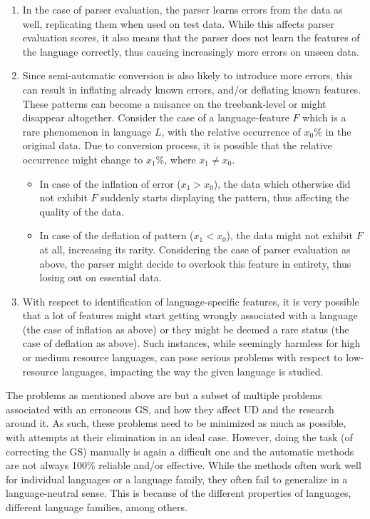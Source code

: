 \begin{enumerate}
    \item In the case of parser evaluation, the parser learns errors from the data as well, replicating them when used on test data. While this affects parser evaluation scores, it also means that the parser does not learn the features of the language correctly, thus causing increasingly more errors on unseen data.
    \item Since semi-automatic conversion is also likely to introduce more errors, this can result in inflating already known errors, and/or deflating known features. These patterns can become a nuisance on the treebank-level or might disappear altogether. Consider the case of a language-feature \(F\) which is a rare phenomenon in language \(L\), with the relative occurrence of \(x_0 \%\) in the original data. Due to conversion process, it is possible that the relative occurrence might change to \(x_1 \%\), where \(x_1 \neq x_0\).
    \begin{itemize}
        \item In case of the inflation of error (\(x_1 > x_0\)), the data which otherwise did not exhibit \(F\) suddenly starts displaying the pattern, thus affecting the quality of the data.
        \item In case of the deflation of pattern (\(x_1 < x_0\)), the data might not exhibit \(F\) at all, increasing its rarity. Considering the case of parser evaluation as above, the parser might decide to overlook this feature in entirety, thus losing out on essential data.
    \end{itemize}
    \item With respect to identification of language-specific features, it is very possible that a lot of features might start getting wrongly associated with a language (the case of inflation as above) or they might be deemed a rare status (the case of deflation as above). Such instances, while seemingly harmless for high or medium resource languages, can pose serious problems with respect to low-resource languages, impacting the way the given language is studied.
\end{enumerate}

The problems as mentioned above are but a subset of multiple problems associated with an erroneous GS, and how they affect UD and the research around it. As such, these problems need to be minimized as much as possible, with attempts at their elimination in an ideal case. However, doing the task (of correcting the GS) manually is again a difficult one and the automatic methods are not always 100\% reliable and/or effective. While the methods often work well for individual languages or a language family, they often fail to generalize in a language-neutral sense. This is because of the different properties of languages, different language families, among others.

